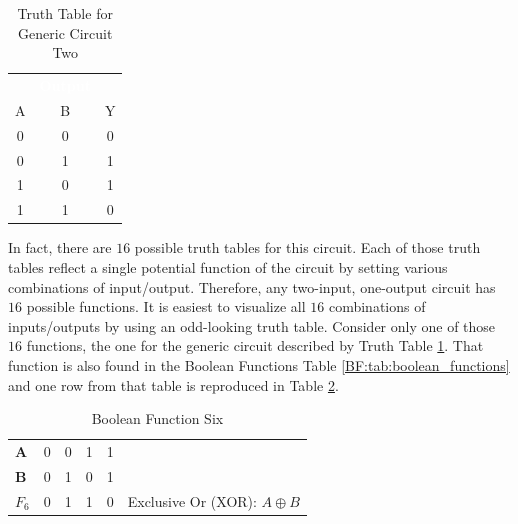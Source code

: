 \begin{table}[H]
  \sffamily
  \newcommand{\head}[1]{\textcolor{white}{\textbf{#1}}}    
  \begin{center}
    \begin{tabular}{ccc} 
      \rowcolor{black!75}
      \multicolumn{2}{c}{\head{Inputs}} & \head{Output} \\
      A & B & Y \\
      \hline
      0 & 0 & 0 \\
      0 & 1 & 1 \\
      1 & 0 & 1 \\
      1 & 1 & 0 
    \end{tabular}
  \end{center}
  \caption{Truth Table for Generic Circuit Two}
  \label{BF:tab:truth_table_for_generic_circuit_two}
\end{table}

In fact, there are $ 16 $ possible truth tables for this circuit. Each of those truth tables reflect a single potential function of the circuit by setting various combinations of input/output. Therefore, any two-input, one-output circuit has $ 16 $ possible functions. It is easiest to visualize all $ 16 $ combinations of inputs/outputs by using an odd-looking truth table. Consider only one of those $ 16 $ functions, the one for the generic circuit described by Truth Table \ref{BF:tab:truth_table_for_generic_circuit_two}. That function is also found in the Boolean Functions Table \ref{BF:tab:boolean_functions} and one row from that table is reproduced in Table \ref{BF:tab:boolean_function_six}.

\begin{table}[H]
  \sffamily
  \newcommand{\head}[1]{\textcolor{white}{\textbf{#1}}}    
  \begin{center}
    \begin{tabular}{llllll}
      \textbf{A} & 0 & \cellcolor{gray!10}0 & 1 & 1 &  \\ 
      \textbf{B} & 0 & \cellcolor{gray!10}1 & 0 & 1 &  \\ \hline
      $ F_{6} $ & 0 & \cellcolor{gray!10}1 & 1 & 0 
      & Exclusive Or (XOR): $ A \oplus B $ \\ 
    \end{tabular} 
  \end{center}
  \caption{Boolean Function Six}
  \label{BF:tab:boolean_function_six}
\end{table}

